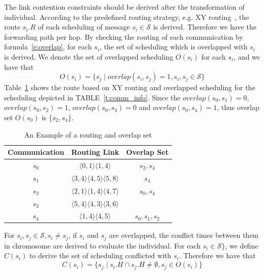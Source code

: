 \documentclass[journal]{IEEEtran}
\newcommand{\calS}{\mathcal{S}}
\begin{document}
The link contention constraints should be derived after the transformation of individual.
According to the predefined routing strategy,
 e.g. XY routing~\cite{DBLP:books/daglib/0087651},
  the route $s_i.R$ of each scheduling of message $s_i\in \calS$ is derived.
Therefore we have the forwarding path per hop.
By checking the routing of each communication by formula~\ref{e:overlap},
 for each $s_i$,
 the set of scheduling which is overlapped with $s_i$ is derived.
We denote the set of overlapped scheduling $O(s_i)$ for each $s_i$,
and we have that
\begin{equation}
	O(s_i) = \{ s_j \mid overlap(s_i,s_j)=1,s_i,s_j\in \calS  \}
\end{equation}
Table~\ref{t:overlap} shows the route based on XY routing and overlapped scheduling for the scheduling depicted in TABLE~\ref{t:comm_info}.
Since the $overlap(s_{0},s_{1})=0$, $overlap(s_{0},s_{2})=1$, $overlap(s_{0},s_{3})=0$ and $overlap(s_{0},s_{4})=1$, thus overlap set $O(s_{0})$ is $\{ s_{2},s_{4} \}$. 

\begin{table}[!t]
	\renewcommand{\arraystretch}{1.3}
	\caption{An Example of a routing and overlap set}
	\label{t:overlap}
	\centering
	\begin{tabular}{|c||c||c|}
		\hline
		\textbf{Communication} & \textbf{Routing Link}& \textbf{Overlap Set}\\
		\hline
		$s_{0}$ & $ \langle 0,1\rangle\langle 1,4\rangle$ 		& $s_{2},s_{4}$ \\
		\hline
		$s_{1}$ & $ \langle 3,4\rangle\langle 4,5\rangle\langle 5,8\rangle$	& $s_{4}$ \\
		\hline
		$s_{2}$ & $ \langle 2,1\rangle\langle 1,4\rangle\langle 4,7\rangle$ 	& $s_{0},s_{4}$ \\
		\hline		
		$s_{3}$ & $ \langle 5,4\rangle\langle 4,3\rangle\langle 3,6\rangle$ 	& \\
		\hline
		$s_{4}$ & $ \langle 1,4\rangle\langle 4,5\rangle$ 		& $s_{0},s_{1},s_{2}$ \\
		\hline		
	\end{tabular}
\end{table}

For $s_{i},s_{j}\in \calS, s_{i}\neq s_{j}$,
if $s_i$ and $s_j$ are overlapped,
the conflict times between them in chromosome are derived to evaluate the individual.
For each $s_{i}\in \calS\}$,
 we define $C(s_{i})$ to derive the set of scheduling conflicted with $s_{i}$. Therefore we have that
\begin{equation}
	C(s_i) = \{ s_j \mid s_i.H \cap s_j.H \neq \emptyset  ,s_j\in O(s_i) \}
\end{equation}
   
\end{document}
